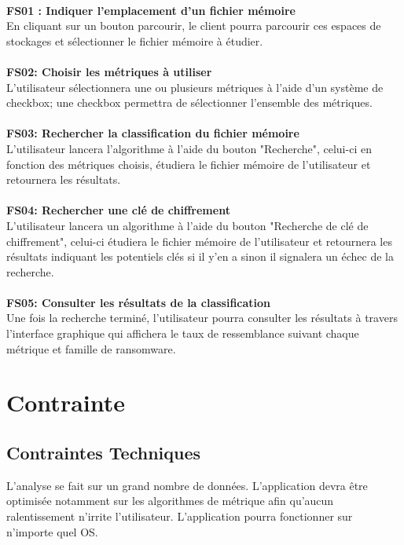 \documentclass[a4paper, 12pt, twoside]{article}
\begin{document}
\paragraph{}
{\bfseries FS01 : Indiquer l'emplacement d'un fichier mémoire}\\
En cliquant sur un bouton parcourir, le client pourra parcourir ces espaces de stockages et sélectionner le fichier mémoire à étudier.
\paragraph{}
{\bfseries FS02: Choisir les métriques à utiliser}\\
L'utilisateur sélectionnera une ou plusieurs métriques à l'aide d'un système de checkbox; une checkbox permettra de sélectionner l'ensemble des métriques.
\paragraph{}
{\bfseries FS03: Rechercher la classification du fichier mémoire}\\
L'utilisateur lancera l'algorithme à l'aide du bouton "Recherche", celui-ci en fonction des métriques choisis, étudiera le fichier mémoire de l'utilisateur et retournera les résultats.
\paragraph{}
{\bfseries FS04: Rechercher une clé de chiffrement}\\
L'utilisateur lancera un algorithme à l'aide du bouton "Recherche de clé de chiffrement", celui-ci étudiera le fichier mémoire de l'utilisateur et retournera les résultats indiquant les potentiels clés si il y'en a sinon il signalera un échec de la recherche.
\paragraph{}
{\bfseries FS05: Consulter les résultats de la classification}\\
Une fois la recherche terminé, l'utilisateur pourra consulter les résultats à travers l'interface graphique qui affichera le taux de ressemblance suivant chaque métrique et famille de ransomware.
\section{Contrainte}
\subsection{Contraintes Techniques}
L’analyse se fait sur un grand nombre de données. L’application devra être optimisée notamment sur les algorithmes de métrique afin qu’aucun ralentissement n’irrite l’utilisateur. L’application pourra fonctionner sur n’importe quel OS.
\end{document}
